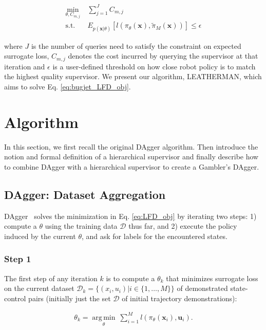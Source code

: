 \documentclass[10pt, conference]{ieeeconf}      %
\DeclareMathOperator*{\argmin}{arg\,min}
\newcommand{\bu}{\mathbf{u}}
\newcommand{\bx}{\mathbf{x}}
\begin{document}
 \vspace{-2ex}
\begin{align}\label{eq:bugjet_LFD_obj}
\underset{\theta,C_{m,j}}{\min} \: & \sum^J_{j=1} C_{m,j}\\
 \mbox{s.t.} \: &E_{p(\bx|\theta)} [l(\pi_\theta(\bx),\tilde{\pi}_M(\bx))] \leq \epsilon
\end{align}

where $J$ is the number of queries need to satisfy the constraint on expected surrogate loss, $C_{m,j}$ denotes the cost incurred by querying the supervisor at that iteration and $\epsilon$ is a user-defined threshold on how close robot policy is to match the highest quality supervisor. We present our algorithm, LEATHERMAN, which aims to solve Eq. \ref{eq:bugjet_LFD_obj}.
 
 
 \section{Algorithm}
 In this section, we first recall the original DAgger algorithm. Then introduce the notion and formal definition of a hierarchical supervisor and finally describe how to combine DAgger with a hierarchical supervisor to create a Gambler's DAgger. 
 
 \subsection{DAgger: Dataset Aggregation}
 DAgger~\cite{ross2010reduction} solves the minimization in Eq. \ref{eq:LFD_obj} by iterating two steps: 1) compute a $\theta$ using the training data $\mathcal{D}$ thus far, and 2) execute the policy induced by the current $\theta$, and ask for labels for the encountered states. 

 
\subsubsection{Step 1}
The first step of any iteration $k$ is to compute a $\theta_k$ that minimizes surrogate loss on the current dataset $\mathcal{D}_k=\{(x_i,u_i)|i\in\{1,\ldots,M\}\}$ of demonstrated state-control pairs (initially just the set $\mathcal{D}$ of initial trajectory demonstrations):

 \vspace{-1ex}
\begin{align}\label{eq:super_objj}
\theta_{k} = \underset{\theta}{\argmin} \: \sum_{i=1}^{M} l(\pi_{\theta}(\bx_i),\bu_i).
\end{align}
\end{document}
